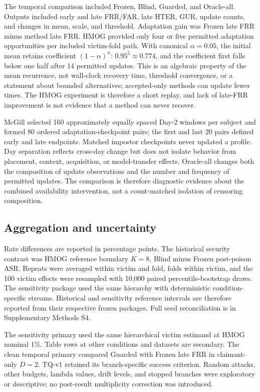 \documentclass[technologies,article,submit,moreauthors]{Definitions/mdpi}
\begin{document}
The temporal comparison included Frozen, Blind, Guarded, and Oracle-all. Outputs included early and late FRR/FAR, late HTER, GUR, update counts, and changes in mean, scale, and threshold. Adaptation gain was Frozen late FRR minus method late FRR. HMOG provided only four or five permitted adaptation opportunities per included victim-fold path. With canonical \(\alpha=0.05\), the initial mean retains coefficient \((1-\alpha)^n\): \(0.95^5\approx0.774\), and the coefficient first falls below one half after 14 permitted updates. This is an algebraic property of the mean recurrence, not wall-clock recovery time, threshold convergence, or a statement about bounded alternatives; accepted-only methods can update fewer times. The HMOG experiment is therefore a short replay, and lack of late-FRR improvement is not evidence that a method can never recover.

McGill selected 160 approximately equally spaced Day-2 windows per subject and formed 80 ordered adaptation-checkpoint pairs; the first and last 20 pairs defined early and late endpoints. Matched impostor checkpoints never updated a profile. Day separation reflects cross-day change but does not isolate behavior from placement, context, acquisition, or model-transfer effects. Oracle-all changes both the composition of update observations and the number and frequency of permitted updates. The comparison is therefore diagnostic evidence about the combined availability intervention, not a count-matched isolation of censoring composition.

\subsection{Aggregation and uncertainty}\label{sec:aggregation-and-uncertainty}

Rate differences are reported in percentage points. The historical security contrast was HMOG reference boundary \(K=8\), Blind minus Frozen post-poison ASR. Repeats were averaged within victim and fold, folds within victim, and the 100 victim effects were resampled with 10,000 paired percentile-bootstrap draws. The sensitivity package used the same hierarchy with deterministic condition-specific streams. Historical and sensitivity reference intervals are therefore reported from their respective frozen packages. Full seed reconciliation is in Supplementary Methods S4.

The sensitivity primary used the same hierarchical victim estimand at HMOG nominal 1\%. Table rows at other conditions and datasets are secondary. The clean temporal primary compared Guarded with Frozen late FRR in claimant-only \(D=2\). TQ-v1 retained its branch-specific success criterion. Random attacks, other budgets, lambda values, drift levels, and stopped branches were exploratory or descriptive; no post-result multiplicity correction was introduced.
\end{document}
